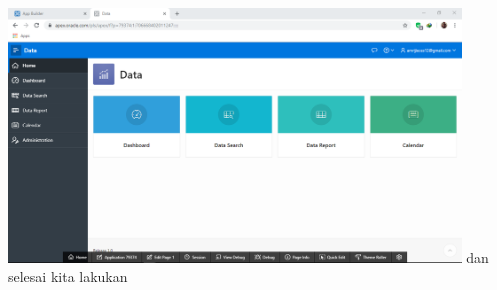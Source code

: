 \documentclass[12pt, times news roman, a4paper] {article}
\begin{document}
\begin{minipage}{\linewidth}
	\centering
	\includegraphics[width=12cm]{Gambar12.png} 
	 {dan selesai kita lakukan } 
\end{minipage}
\end{document}
